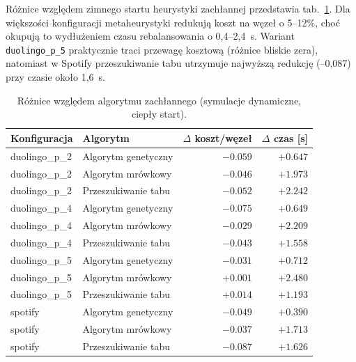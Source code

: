 Różnice względem zimnego startu heurystyki zachłannej przedstawia tab.~\ref{tab:ext-dyn-delta}. Dla większości konfiguracji metaheurystyki redukują koszt na węzeł o 5--12\%, choć okupują to wydłużeniem czasu rebalansowania o 0,4--2,4~s. Wariant \texttt{duolingo\_p\_5} praktycznie traci przewagę kosztową (różnice bliskie zera), natomiast w Spotify przeszukiwanie tabu utrzymuje najwyższą redukcję (–0,087) przy czasie około 1,6~s.

\begin{table}[H]
  \centering
  \caption{Różnice względem algorytmu zachłannego (symulacje dynamiczne, ciepły start).}
  \label{tab:ext-dyn-delta}
  \begin{tabular}{llrr}
    \toprule
    \textbf{Konfiguracja} & \textbf{Algorytm}   & \textbf{$\Delta$ koszt/węzeł} & \textbf{$\Delta$ czas [s]} \\
    \midrule
    duolingo\_p\_2        & Algorytm genetyczny & $-0.059$                      & $+0.647$                   \\
    duolingo\_p\_2        & Algorytm mrówkowy   & $-0.046$                      & $+1.973$                   \\
    duolingo\_p\_2        & Przeszukiwanie tabu & $-0.052$                      & $+2.242$                   \\
    duolingo\_p\_4        & Algorytm genetyczny & $-0.075$                      & $+0.649$                   \\
    duolingo\_p\_4        & Algorytm mrówkowy   & $-0.029$                      & $+2.209$                   \\
    duolingo\_p\_4        & Przeszukiwanie tabu & $-0.043$                      & $+1.558$                   \\
    duolingo\_p\_5        & Algorytm genetyczny & $-0.031$                      & $+0.712$                   \\
    duolingo\_p\_5        & Algorytm mrówkowy   & $+0.001$                      & $+2.480$                   \\
    duolingo\_p\_5        & Przeszukiwanie tabu & $+0.014$                      & $+1.193$                   \\
    spotify               & Algorytm genetyczny & $-0.049$                      & $+0.390$                   \\
    spotify               & Algorytm mrówkowy   & $-0.037$                      & $+1.713$                   \\
    spotify               & Przeszukiwanie tabu & $-0.087$                      & $+1.626$                   \\

\end{tabular}
\end{table}
